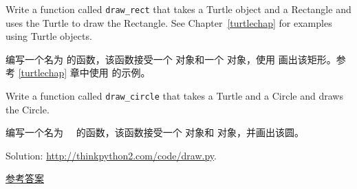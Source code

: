 \begin{exercise}

Write a function called \verb"draw_rect" that takes a Turtle object
and a Rectangle and uses the Turtle to draw the Rectangle.  See
Chapter~\ref{turtlechap} for examples using Turtle objects.

编写一个名为  的函数，该函数接受一个  对象和一个  对象，使用  画出该矩形。参考 \ref{turtlechap} 章中使用  的示例。

Write a function called \verb"draw_circle" that takes a Turtle and
a Circle and draws the Circle.

编写一个名为　 的函数，该函数接受一个  对象和  对象，并画出该圆。

Solution: \url{http://thinkpython2.com/code/draw.py}.

\href{http://thinkpython2.com/code/draw.py}{参考答案}

\end{exercise}